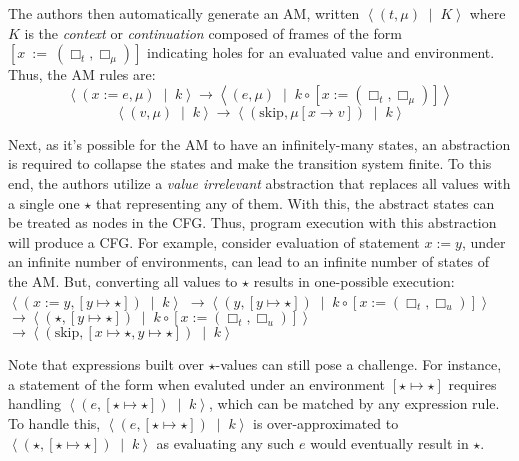 The authors then automatically generate an AM, written
$\left\langle \left(t, \mu\right) \;\mid\; K\right\rangle$ where $K$ is the
\emph{context} or \emph{continuation} composed of frames of the form $[x\ :=\
(\Box_{t}, \Box_{\mu})]$ indicating holes for an evaluated value and
environment. Thus, the AM rules are:
$$
\left\langle \left( x := e, \mu \right)\;\mid\; k \right\rangle \rightarrow
\left\langle \left( e, \mu \right)\;\mid\; k \circ \left[x := \left(\Box_t,\Box_{\mu}\right) \right]\right\rangle
$$
$$
\left\langle \left( v, \mu \right)\;\mid\; k \right\rangle \rightarrow
\left\langle \left(\text{skip}, \mu\left[x \rightarrow v \right] \right) \;\mid\; k \right\rangle
$$

Next, as it's possible for the AM to have an infinitely-many states, an
abstraction is required to collapse the states and make the transition system
finite. To this end, the authors utilize a \emph{value irrelevant} abstraction
that replaces all values with a single one $\star$ that representing any of
them. With this, the abstract states can be treated as nodes in the CFG.
Thus, program execution with this abstraction will produce a CFG.
For example, consider evaluation of statement $x := y$, under an
infinite number of environments, can lead to an infinite number of
states of the AM.
But, converting all values to $\star$ results in
one-possible execution: $\left\langle \left( x := y, \left[ y \mapsto \star
    \right] \right) \;\mid\; k \right\rangle$
$\rightarrow  \left\langle \left(y, \left[ y \mapsto \star \right] \right) \;\mid\; k \circ \left[ x := \left(\Box_t,\Box_u\right) \right] \right\rangle$
$\rightarrow  \left\langle \left(\star, \left[ y \mapsto \star \right] \right) \;\mid\; k \circ \left[ x := \left(\Box_t,\Box_u\right) \right] \right\rangle$
$\rightarrow  \left\langle \left(\text{skip}, \left[x \mapsto \star, y \mapsto \star \right] \right) \;\mid\; k \right\rangle$

Note that expressions built over $\star$-values can still pose a
challenge. For instance, a statement of the form  when
evaluted under an environment $\left[\star \mapsto \star\right]$ requires
handling $\left\langle \left(e, \left[ \star \mapsto \star \right] \right)\;\mid\; k
\right\rangle$, which can be matched by any expression rule. To handle this,
$\left\langle \left(e, \left[ \star \mapsto \star \right] \right)\;\mid\; k \right\rangle$
is over-approximated to $\left \langle \left(\star, \left[ \star \mapsto \star \right] \right)\;\mid\; k \right\rangle$
as evaluating any such $e$ would eventually result in $\star$.


